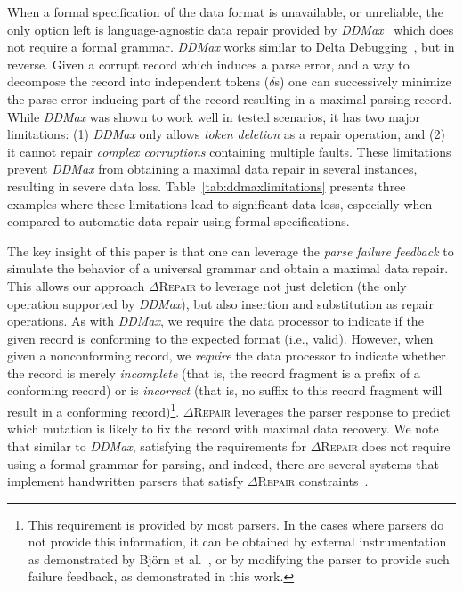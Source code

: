 \documentclass[acmsmall,screen,review,anonymous]{acmart}
\newcommand{\dtask}{data repair\xspace}
\newcommand{\approach}{\textsc{$\Delta$Repair}\xspace}
\newcommand{\ddmax}{\textit{DDMax}\xspace}
\begin{document}
When a formal specification of the data format is unavailable, or unreliable,
the only option left is language-agnostic \dtask provided by
\ddmax~\cite{kirschner2020debugging} which does not require a formal grammar.
\ddmax works similar to Delta Debugging~\cite{zeller2002simplifying},
but in reverse.
Given a corrupt record which induces a parse error,
and a way to decompose the record into independent tokens ($\delta$s)
one can successively minimize the parse-error inducing part of the
record resulting in a maximal parsing record.
While \ddmax was shown to work well in tested scenarios, it has two major limitations:
(1) \ddmax only allows \emph{token deletion} as a repair operation, and 
(2) it cannot repair \emph{complex corruptions} containing multiple faults.
These limitations prevent \ddmax from obtaining a maximal data repair in
several instances, resulting in severe data loss.
Table~\ref{tab:ddmaxlimitations} presents three examples where these
limitations lead to significant data loss, especially when compared to
automatic \dtask using formal specifications.

The key insight of this paper is that one can leverage the \emph{parse failure feedback}
to simulate the behavior of a universal grammar and obtain a maximal data repair.
This allows our approach \approach to leverage not just deletion (the only operation supported by \ddmax), but also insertion and substitution as repair
operations. %
As with \ddmax, we require the data processor to indicate if the given record
is conforming to the expected format (i.e., valid).  However, when given a nonconforming record,
we \textit{require} the data processor to indicate whether the record is
merely \emph{incomplete} (that is, the record fragment is a prefix of a conforming record)
or is \emph{incorrect} (that is, no suffix to
this record fragment will result in a conforming record)\footnote{This requirement is
provided by most parsers. %
In the cases where parsers do not provide
this information, it can be obtained
by external instrumentation 
as demonstrated by Bj\"orn et al.~\cite{mathis2019parser}, or 
by modifying the parser to provide such failure feedback, as demonstrated in this work. 
}. \approach leverages the parser response to predict which mutation is likely to fix the record with maximal data recovery. 
We note that similar to \ddmax,
satisfying the requirements for \approach does not require using a
formal grammar for parsing, and indeed, there are several systems that
implement handwritten parsers that satisfy \approach
constraints~\cite{eaton2021parser}.
\end{document}
